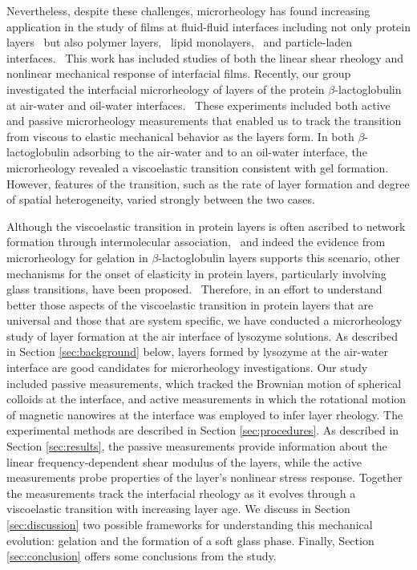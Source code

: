 Nevertheless, despite these challenges, microrheology has found increasing application in the study of films at fluid-fluid interfaces including not only protein layers~\cite{Lee2009, Lee2010, Lee2011, Dhar2010, Prasad2006} but also polymer layers,~\cite{Helfer2001, Kandar2010, Maestro2011} lipid monolayers,~\cite{Sickert2007, Choi2011, Kim2011, Park2011, Murakami2010} and particle-laden interfaces.~\cite{Wu2009a, Langer2012}  This work has included studies of both the linear shear rheology and nonlinear mechanical response of interfacial films.  Recently, our group investigated the interfacial microrheology of layers of the protein $\beta$-lactoglobulin  at air-water and oil-water interfaces.~\cite{Lee2010, Lee2011}  These experiments included both active and passive microrheology measurements that enabled us to track the transition from viscous to elastic mechanical behavior as the layers form.  In both $\beta$-lactoglobulin adsorbing to the air-water and to an oil-water interface, the microrheology revealed a viscoelastic transition consistent with gel formation.  However, features of the transition, such as the rate of layer formation and degree of spatial heterogeneity, varied strongly between the two cases.~\cite{Lee2010, Lee2011} 

Although the viscoelastic transition in protein layers is often ascribed to network formation through intermolecular association,~\cite{Bos2001, Murray2002, Martin2002, Bantchev2003, Roberts2005, Murray2011a} and indeed the evidence from microrheology for gelation in $\beta$-lactoglobulin layers supports this scenario, other mechanisms for the onset of elasticity in  protein layers, particularly involving glass transitions, have been proposed.~\cite{Wierenga2006, Cicuta2005, Cicuta2003, Cicuta2007}  Therefore, in an effort to understand better those aspects of the viscoelastic transition in protein layers that are universal and those that are system specific, we have conducted a microrheology study of layer formation at the air interface of lysozyme solutions. As described in Section \ref{sec:background} below, layers formed by lysozyme at the air-water interface are good candidates for microrheology investigations.  Our study included passive measurements, which tracked the Brownian motion of spherical colloids at the interface, and active measurements in which the rotational motion of magnetic nanowires at the interface was employed to infer layer rheology.  The experimental methods are described in Section \ref{sec:procedures}.  As described in Section \ref{sec:results}, the passive measurements provide information about the linear frequency-dependent shear modulus of the layers, while the active measurements probe properties of the layer's nonlinear stress response.  Together the measurements track the interfacial rheology as it evolves through a viscoelastic transition with increasing layer age.  We discuss in Section \ref{sec:discussion} two possible frameworks for understanding this mechanical evolution:  gelation and the formation of a soft glass phase.  Finally, Section \ref{sec:conclusion} offers some conclusions from the study.



